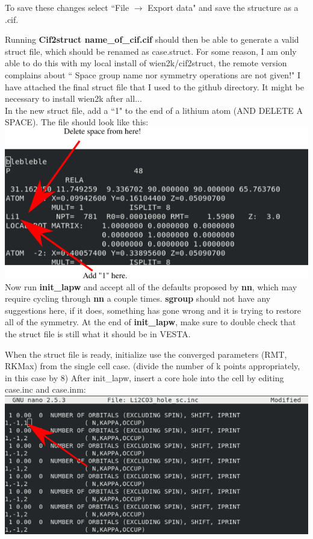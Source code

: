 \documentclass[12pt]{article}
\begin{document}
To save these changes select ``File $\to$ Export data" and save the structure as a .cif.  

Running \textbf{Cif2struct name\_of\_cif.cif} should then be able to generate a valid struct file, which should be renamed as case.struct.  For some reason, I am only able to do this with my local install of wien2k/cif2struct, the remote version complains about `` Space group name nor symmetry operations are not given!"  I have attached the final struct file that I used to the github directory. It might be necessary to install wien2k after all... 
 \\

In the new struct file, add a ``1" to the end of a lithium atom (AND DELETE A SPACE).  The file should look like this: \\

\includegraphics[scale=0.8]{./images/break_sym.png}
\\

Now run \textbf{init\_lapw} and accept all of the defaults proposed by \textbf{nn}, which may require cycling through \textbf{nn } a couple times.  \textbf{sgroup} should not have any suggestions here, if it does, something has gone wrong and it is trying to restore all of the symmetry.  At the end of \textbf{init\_lapw}, make sure to double check that the struct file is still what it should be in VESTA.  


When the struct file is ready, initialize use the converged parameters (RMT, RKMax) from the single cell case. (divide the number of k points appropriately, in this case by 8)  After init\_lapw, insert a core hole into the cell by editing case.inc and case.inm: \\

\includegraphics[scale=0.5]{./images/hole_inc.png}
\end{document}
